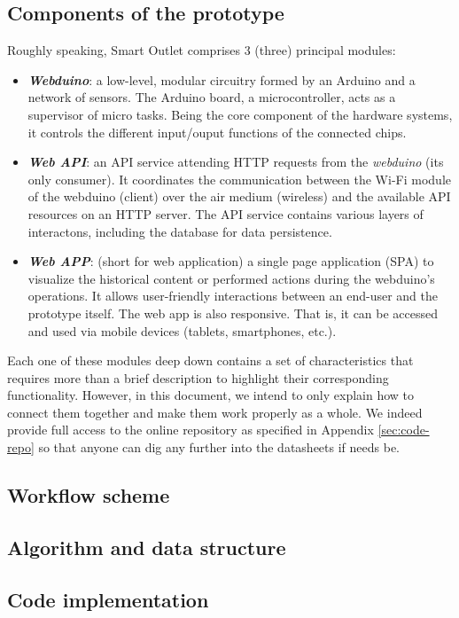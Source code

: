 \subsection{Components of the prototype}
Roughly speaking, Smart Outlet comprises 3 (three) principal modules:
\begin{itemize}
    \item \textbf{\textit{Webduino}}: a low-level, modular circuitry formed by an Arduino and a network of sensors. The Arduino board, a microcontroller, acts as a supervisor of micro tasks. Being the core component of the hardware systems, it controls the different input/ouput functions of the connected chips.
    \item \textbf{\textit{Web API}}: an API service attending HTTP requests from the \emph{webduino} (its only consumer). It coordinates the communication between the Wi-Fi module of the webduino (client) over the air medium (wireless) and the available API resources on an HTTP server. The API service contains various layers of interactons, including the database for data persistence.
    \item \textbf{\textit{Web APP}}: (short for web application) a single page application (SPA) to visualize the historical content or performed actions during the webduino's operations. It allows user-friendly interactions between an end-user and the prototype itself. The web app is also responsive. That is, it can be accessed and used via mobile devices (tablets, smartphones, etc.).
\end{itemize}

Each one of these modules deep down contains a set of characteristics that requires more than a brief description to highlight their corresponding functionality. However, in this document, we intend to only explain how to connect them together and make them work properly as a whole. We indeed provide full access to the online repository as specified in Appendix \ref{sec:code-repo} so that anyone can dig any further into the datasheets if needs be.

\subsection{Workflow scheme}

\subsection{Algorithm and data structure}

\subsection{Code implementation}
